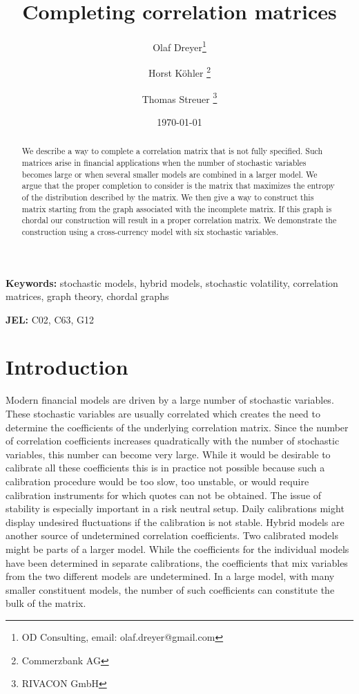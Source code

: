 \documentclass[11pt, a4paper]{article}
\begin{document}
\title{Completing correlation matrices}

\author{Olaf Dreyer\thanks{OD Consulting, email: olaf.dreyer@gmail.com}
\and Horst K\"ohler \thanks{Commerzbank AG}
\and Thomas Streuer \thanks{RIVACON GmbH} }

\date{\today}

\maketitle

\begin{abstract}
	We describe a way to complete a correlation matrix that is not fully specified. Such matrices arise in financial applications when the number of stochastic variables becomes large or when several smaller models are combined in a larger model. We argue that the proper completion to consider is the matrix that maximizes the entropy of the distribution described by the matrix. We then give a way to construct this matrix starting from the graph associated with the incomplete matrix. If this graph is chordal our construction will result in a proper correlation matrix. We demonstrate the construction using a cross-currency model with six stochastic variables.  
\end{abstract}

\textbf{Keywords:} stochastic models, hybrid models, stochastic volatility, correlation matrices, graph theory, chordal graphs

\textbf{JEL:} C02, C63, G12

\section{Introduction}
Modern financial models are driven by a large number of stochastic variables. These stochastic variables are usually correlated which creates the need to determine the coefficients of the underlying correlation matrix. Since the number of correlation coefficients increases quadratically with the number of stochastic variables, this number can become very large. While it would be desirable to calibrate all these coefficients this is in practice not possible because such a calibration procedure would be too slow, too unstable, or would require calibration instruments for which quotes can not be obtained. The issue of stability is especially important in a risk neutral setup. Daily calibrations might display undesired fluctuations if the calibration is not stable. Hybrid models are another source of undetermined correlation coefficients. Two calibrated models might be parts of a larger model. While the coefficients for the individual models have been determined in separate calibrations, the coefficients that mix variables from the two different models are undetermined. In a large model, with many smaller constituent models, the number of such coefficients can constitute the bulk of the matrix. 
\end{document}
